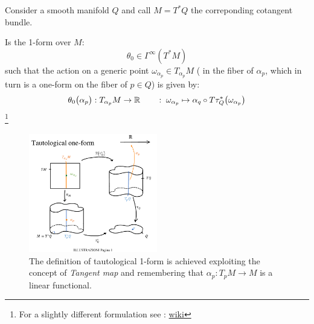 \documentclass[a4paper,12pt]{scrartcl}    %
\begin{document}
	Consider a smooth manifold $Q$ and call $M=T^*Q$ the correponding cotangent bundle.
	\begin{definition}
		Is the 1-form over $M$:
		\begin{displaymath}
			\theta_0 \in \Gamma^\infty (T^*M)
		\end{displaymath}
		such that the action on a generic point $ \omega_{\alpha_p} \in T_{\alpha_p}M$ ( in the fiber of $\alpha_p$, which in turn is a one-form on the fiber of $p\in Q$) is given by:
		\begin{displaymath}
			\theta_0 \big(\alpha_p \big): T_{\alpha_p}M \rightarrow \mathbb{R} \qquad : \; \omega_{\alpha_p} \mapsto \alpha_q \circ T \tau^*_Q \big( \omega_{\alpha_p} \big)
		\end{displaymath}
			\footnote{For a slightly different formulation see : \cite{fraenkel} \cite{fomm} \href{https://en.wikipedia.org/wiki/Tautological_one-form}{wiki}}
	\end{definition}
	\begin{figure}[h!]
   		\includegraphics[width=0.5\textwidth]{Pictures/Tautological1Form} 
 		\caption{The definition of tautological 1-form is achieved exploiting the concept of \emph{Tangent map} and remembering that $\alpha_p: T_p M\rightarrow M$ is a linear functional.} 
  		\centering
	\end{figure}
	
\end{document}

